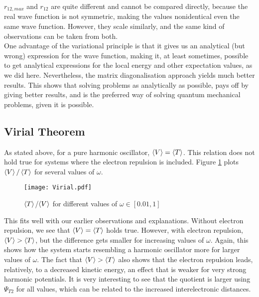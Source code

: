 \documentclass[10pt,a4paper]{article}
\begin{document}
$r_{12,max}$ and $r_{12}$ are quite different and cannot be compared directly, because the real wave function is not symmetric, making the values nonidentical even 	 the same wave function. However, they scale similarly, and the same kind of observations can be taken from both. \\
One advantage of the variational principle is that it gives us an analytical (but wrong) expression for the wave function, making it, at least sometimes, possible to get analytical expressions for the local energy and other expectation values, as we did here. Nevertheless, the matrix diagonalisation approach yields much better results. This shows that solving problems as analytically as possible, pays off by giving better results, and is the preferred way of solving quantum mechanical problems, given it is possible.  
\subsection{Virial Theorem}
As stated above, for a pure harmonic oscillator, $\braket{V}=\braket{T}$. This relation does not hold true for systems where the electron repulsion is included. Figure \ref{Virial} plots $\braket{V}/\braket{T}$ for several values of $\omega$.
\begin{figure}[H]
\centering
\texttt{[image: Virial.pdf]}\label{Virial}
\caption[$\braket{T}$/$0\braket{V}$ as function of $\omega$]{$\braket{T}$/$\braket{V}$ for different values of $\omega\in[0.01,1]$}
\end{figure}
This fits well with our earlier observations and explanations. Without electron repulsion, we see that $\braket{V}=\braket{T}$ holds true. However, with electron repulsion, $\braket{V}>\braket{T}$, but the difference gets smaller for increasing values of $\omega$. Again, this shows how the system starts resembling a harmonic oscillator more for larger values of $\omega$. The fact that $\braket{V}>\braket{T}$ also shows that the electron repulsion leads, relatively, to a decreased kinetic energy, an effect that is weaker for very strong harmonic potentials. It is very interesting to see that the quotient is larger using $\Psi_{T2}$ for all values, which can be related to the increased interelectronic distances. 
\end{document}
